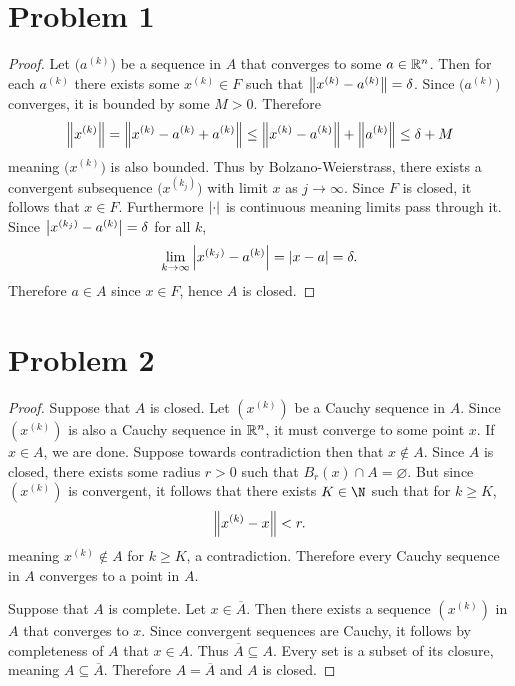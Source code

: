 \documentclass{eeleyes}
\newcommand\conj[1]{\overline{#1}}
\begin{document}
\section*{Problem 1}
\begin{proof}
    Let $\bigl(a^{(k)}\bigr)$ be a sequence in $A$ that converges to some $a \in \mathbb{R}^n$. Then for each $a^{(k)}$ there exists some $x^{(k)} \in F$ such that $\norm{x^{(k)} - a^{(k)}} = \delta$. Since $\bigl(a^{(k)}\bigr)$ converges, it is bounded by some $M > 0$. Therefore
    \[
        \norm{x^{(k)}} = \norm{x^{(k)} - a^{(k)} + a^{(k)}} \leq \norm{x^{(k)} - a^{(k)}} + \norm{a^{(k)}} \leq \delta + M
    \]
    meaning $\bigl(x^{(k)}\bigr)$ is also bounded. Thus by Bolzano-Weierstrass, there exists a convergent subsequence $\bigl(x^{(k_j)}\bigr)$ with limit $x$ as $j \to \infty$. Since $F$ is closed, it follows that $x \in F$. Furthermore $\qty| \cdot |$ is continuous meaning limits pass through it. Since $\qty|x^{(k_j)} - a^{(k)}| = \delta$ for all $k$,
    \[
        \lim_{k \to \infty} \qty|x^{(k_j)} - a^{(k)}| = \qty|x - a| = \delta
    .\]
    Therefore $a \in A$ since $x \in F$, hence $A$ is closed.
\end{proof}

\section*{Problem 2}
\begin{proof}
    Suppose that $A$ is closed. Let $(x^{(k)})$ be a Cauchy sequence in $A$. Since $(x^{(k)})$ is also a Cauchy sequence in $\mathbb{R}^n$, it must converge to some point $x$. If $x \in A$, we are done. Suppose towards contradiction then that $x \notin A$. Since $A$ is closed, there exists some radius $r > 0$ such that $B_r(x) \cap A = \varnothing$. But since $(x^{(k)})$ is convergent, it follows that there exists $K \in \N$ such that for $k \geq K$,
    \[
        \norm{x^{(k)} - x} < r
    .\]
    meaning $x^{(k)} \notin A$ for $k \geq K$, a contradiction. Therefore every Cauchy sequence in $A$ converges to a point in $A$.

    Suppose that $A$ is complete. Let $x \in \conj{A}$. Then there exists a sequence $(x^{(k)})$ in $A$ that converges to $x$. Since convergent sequences are Cauchy, it follows by completeness of $A$ that $x \in A$. Thus $\conj{A} \subseteq A$. Every set is a subset of its closure, meaning $A \subseteq \conj{A}$. Therefore $A = \conj{A}$ and $A$ is closed.
\end{proof}
\end{document}
